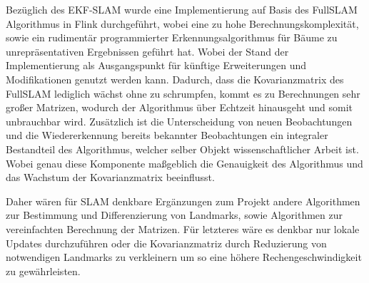 \documentclass[11pt]{article}
\begin{document}
Bezüglich des EKF-SLAM wurde eine Implementierung auf Basis des FullSLAM Algorithmus in Flink durchgeführt, wobei eine zu hohe Berechnungskomplexität, sowie ein rudimentär programmierter Erkennungsalgorithmus für Bäume zu unrepräsentativen Ergebnissen geführt hat. Wobei der Stand der Implementierung als Ausgangspunkt für künftige Erweiterungen und Modifikationen genutzt werden kann. Dadurch, dass die Kovarianzmatrix des FullSLAM lediglich wächst ohne zu schrumpfen, kommt es zu Berechnungen sehr großer Matrizen, wodurch der Algorithmus über Echtzeit hinausgeht und somit unbrauchbar wird. 
Zusätzlich ist die Unterscheidung von neuen Beobachtungen und die Wiedererkennung bereits bekannter Beobachtungen ein integraler Bestandteil des Algorithmus, welcher selber Objekt wissenschaftlicher Arbeit ist. Wobei genau diese Komponente maßgeblich die Genauigkeit des Algorithmus und das Wachstum der Kovarianzmatrix beeinflusst. 

Daher wären für SLAM denkbare Ergänzungen zum Projekt andere Algorithmen zur Bestimmung und Differenzierung von Landmarks, sowie Algorithmen zur vereinfachten Berechnung der Matrizen. Für letzteres wäre es denkbar nur lokale Updates durchzuführen oder die Kovarianzmatriz durch Reduzierung von notwendigen Landmarks zu verkleinern um so eine höhere Rechengeschwindigkeit zu gewährleisten.



\end{document}
